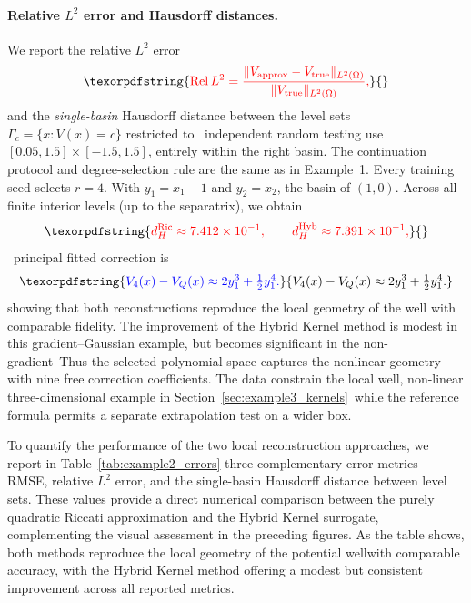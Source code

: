 \documentclass[11pt]{article}
\theoremstyle{plain}      %
\theoremstyle{definition} %
\providecommand{\DIFaddtex}[1]{{\protect\color{blue}#1}} %
\providecommand{\DIFdeltex}[1]{{\protect\color{red}#1}} %
\providecommand{\DIFaddbegin}{} %
\providecommand{\DIFaddend}{} %
\providecommand{\DIFdelbegin}{} %
\providecommand{\DIFdelend}{} %
\providecommand{\DIFadd}[1]{\texorpdfstring{\DIFaddtex{#1}}{#1}} %
\providecommand{\DIFdel}[1]{\texorpdfstring{\DIFdeltex{#1}}{}} %
\newcommand{\DIFscaledelfig}{1.0}
\newlength{\DIFdelgraphicswidth} %
\newlength{\DIFdelgraphicsheight} %
\newcommand{\DIFaddincludegraphics}[2][]{{\color{blue}\fbox{\DIFOincludegraphics[#1]{#2}}}} %
\newcommand{\DIFdelincludegraphics}[2][]{%
\sbox{\DIFdelgraphicsbox}{\DIFOincludegraphics[#1]{#2}}%
\settoboxwidth{\DIFdelgraphicswidth}{\DIFdelgraphicsbox} %
\settoboxtotalheight{\DIFdelgraphicsheight}{\DIFdelgraphicsbox} %
\scalebox{\DIFscaledelfig}{%
\parbox[b]{\DIFdelgraphicswidth}{\usebox{\DIFdelgraphicsbox}\\[-\baselineskip] \rule{\DIFdelgraphicswidth}{0em}}\llap{\resizebox{\DIFdelgraphicswidth}{\DIFdelgraphicsheight}{%
\setlength{\unitlength}{\DIFdelgraphicswidth}%
\begin{picture}(1,1)%
\thicklines\linethickness{2pt} %
{\color[rgb]{1,0,0}\put(0,0){\framebox(1,1){}}}%
{\color[rgb]{1,0,0}\put(0,0){\line( 1,1){1}}}%
{\color[rgb]{1,0,0}\put(0,1){\line(1,-1){1}}}%
\end{picture}%
}\hspace*{3pt}}} %
} %
\DeclareRobustCommand{\DIFaddbegin}{\DIFOaddbegin \let\includegraphics\DIFaddincludegraphics} %
\DeclareRobustCommand{\DIFaddend}{\DIFOaddend \let\includegraphics\DIFOincludegraphics} %
\DeclareRobustCommand{\DIFdelbegin}{\DIFOdelbegin \let\includegraphics\DIFdelincludegraphics} %
\DeclareRobustCommand{\DIFdelend}{\DIFOaddend \let\includegraphics\DIFOincludegraphics} %
\begin{document}
\paragraph{\DIFdel{Relative $L^2$ error and Hausdorff distances.}}
\addtocounter{paragraph}{-1}%
\DIFdel{We report the relative $L^2$ error
}\[
\DIFdel{\mathrm{Rel}\,L^2
=
\frac{\|V_{\mathrm{approx}} - V_{\mathrm{true}}\|_{L^2(\Omega)}}{\|V_{\mathrm{true}}\|_{L^2(\Omega)}},
}\]%
\DIFdel{and the \emph{single-basin} Hausdorff distance between the level sets
$\Gamma_c = \{x : V(x)=c\}$ restricted to }\DIFdelend\ \DIFaddbegin \DIFadd{independent random testing use $[0.05,1.5]\times[-1.5,1.5]$, entirely within the right basin. The continuation protocol and degree-selection rule are the same as in Example~1. Every training seed selects $r=4$. With $y_1=x_1-1$ and $y_2=x_2$, }\DIFaddend the \DIFdelbegin \DIFdel{basin of $(1,0)$. Across all finite interior levels (up to the separatrix), we obtain
}\[
\DIFdel{d_H^{\mathrm{Ric}} \approx 7.412\times10^{-1},
\qquad
d_H^{\mathrm{Hyb}} \approx 7.391\times10^{-1},
}\]%
\DIFdelend\ \DIFaddbegin \DIFadd{principal fitted correction is
}\[
 \DIFadd{V_4(x)-V_Q(x)\approx 2y_1^3+\tfrac12y_1^4.
}\]\DIFaddend 
\DIFdelbegin \DIFdel{showing that both reconstructions reproduce the local geometry of the well with
comparable fidelity. The improvement of the Hybrid Kernel method is
modest in
this gradient–Gaussian example, but becomes significant in the non-gradient}\DIFdelend\ \DIFaddbegin \DIFadd{Thus the selected polynomial space captures the nonlinear geometry with nine free correction coefficients. The data constrain the local well}\DIFaddend , \DIFdelbegin \DIFdel{non-linear three-dimensional example in Section~\ref{sec:example3_kernels}}\DIFdelend\ \DIFaddbegin \DIFadd{while the reference formula permits a separate extrapolation test on a wider box}\DIFaddend .

\DIFdelbegin \DIFdel{To quantify the performance of the two local reconstruction approaches, we report in
Table~\ref{tab:example2_errors} three complementary error metrics—RMSE, relative
$L^{2}$ error, and the single-basin Hausdorff distance between level sets. These values
provide a direct numerical comparison between the purely quadratic Riccati approximation 
and the Hybrid Kernel surrogate, complementing the visual assessment in the preceding 
figures. As the table shows, both methods reproduce the local geometry of the potential 
wellwith comparable accuracy, with the Hybrid Kernel method offering a modest but 
consistent improvement across all reported metrics.
}%
\end{document}
